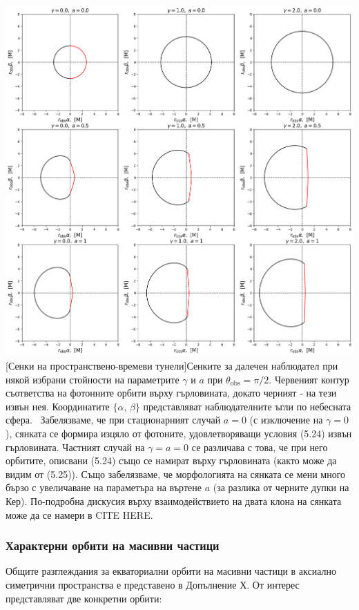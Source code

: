 \hspace{-0.5cm}
\includegraphics[scale = 0.3]{WH_Shadows.png}
[Сенки на пространствено-времеви тунели]{\small Сенките за далечен наблюдател при някой избрани стойности на параметрите $\gamma$ и $a$ при $\theta_\text{obs} = \pi / 2$. Червеният контур съответства на фотонните орбити върху гърловината, докато черният - на тези извън нея. Координатите $\{\alpha,\,\beta\}$ представляват наблюдателните ъгли по небесната сфера.}
\label{WH_shadows}
$\,$
\newline
Забелязваме, че при стационарният случай $a = 0$ (с изключение на $\gamma = 0$), сянката се формира изцяло от фотоните, удовлетворяващи условия (5.24) извън гърловината. Частният случай на $\gamma = a = 0$ се различава с това, че при него орбитите, описвани (5.24) също се намират върху гърловината (както може да видим от (5.25)). Също забелязваме, че морфологията на сянката се мени много бързо с увеличаване на параметъра на въртене $a$ (за разлика от черните дупки на Кер). По-подробна дискусия върху взаимодействието на двата клона на сянката може да се намери в CITE HERE.

\subsubsection{Характерни орбити на масивни частици}
Общите разглеждания за екваториални орбити на масивни частици в аксиално симетрични пространства е представено в Допълнение Х. От интерес представляват две конкретни орбити:\\

